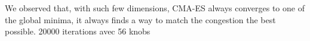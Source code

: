 We observed that, with such few dimensions, CMA-ES always converges to one of the global minima, it always finds a way to match the congestion the best possible.
20000 iterations avec 56 knobs
